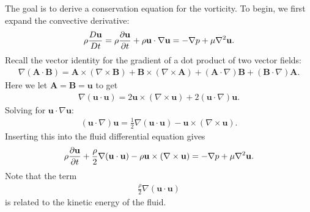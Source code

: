 The goal is to derive a conservation equation for the vorticity. To begin, we first expand the convective derivative:
\begin{align}
  \rho \frac{D\mathbf{u}}{Dt} = \rho \frac{ \partial {\mathbf{u}} }{ \partial {t} } + \rho \mathbf{u} \cdot \nabla \mathbf{u} =  -\nabla p + \mu \nabla^2 \mathbf{u}.
\end{align}
Recall the vector identity for the gradient of a dot product of two vector fields:
\begin{align}
  \nabla ( \mathbf{A} \cdot \mathbf{B} ) = 
  \mathbf{A} \times ( \nabla \times \mathbf{B} ) + \mathbf{B} \times ( \nabla \times \mathbf{A} ) 
  + ( \mathbf{A} \cdot \nabla ) \mathbf{B} + ( \mathbf{B} \cdot \nabla ) \mathbf{A}. \nonumber
\end{align}
Here we let $\mathbf{A} = \mathbf{B} = \mathbf{u}$ to get
\begin{align}
  \nabla ( \mathbf{u} \cdot \mathbf{u} ) = 2 \mathbf{u} \times ( \nabla \times \mathbf{u} ) + 2 ( \mathbf{u} \cdot \nabla ) \mathbf{u} .
\end{align}
Solving for $\mathbf{u} \cdot \nabla \mathbf{u}$:
\begin{align}
  ( \mathbf{u} \cdot \nabla ) \mathbf{u} = \frac{1}{2} \nabla ( \mathbf{u} \cdot \mathbf{u} ) - \mathbf{u} \times ( \nabla \times \mathbf{u} ).
\end{align}
Inserting this into the fluid differential equation gives
\begin{align}
  \rho \frac{ \partial {\mathbf{u}} }{ \partial {t} } + \frac{\rho}{2} \nabla ( \mathbf{u} \cdot \mathbf{u} ) - \rho \mathbf{u} \times ( \nabla \times \mathbf{u} ) =  -\nabla p + \mu \nabla^2 \mathbf{u}.
\end{align}
Note that the term
\begin{align}
  \frac{\rho}{2} \nabla ( \mathbf{u} \cdot \mathbf{u} ) \nonumber
\end{align}
is related to the kinetic energy of the fluid.

